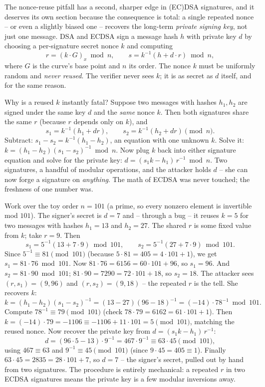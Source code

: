 The nonce-reuse pitfall has a second, sharper edge in (EC)DSA signatures, and it deserves its own section because the consequence is total: a single repeated nonce -- or even a slightly biased one -- recovers the long-term \emph{private signing key}, not just one message. DSA and ECDSA sign a message hash $h$ with private key $d$ by choosing a per-signature secret nonce $k$ and computing
\[
r = (k\cdot G)_x \bmod n, \qquad s = k^{-1}(h + d\cdot r) \bmod n,
\]
where $G$ is the curve's base point and $n$ its order. The nonce $k$ must be uniformly random and \emph{never reused}. The verifier never sees $k$; it is as secret as $d$ itself, and for the same reason.

\begin{whybox}
Why is a reused $k$ instantly fatal? Suppose two messages with hashes $h_1, h_2$ are signed under the same key $d$ and the \emph{same} nonce $k$. Then both signatures share the same $r$ (because $r$ depends only on $k$), and
\[
s_1 = k^{-1}(h_1 + d r), \qquad s_2 = k^{-1}(h_2 + d r) \pmod n.
\]
Subtract: $s_1 - s_2 = k^{-1}(h_1 - h_2)$, an equation with one unknown $k$. Solve it: $k = (h_1 - h_2)(s_1 - s_2)^{-1} \bmod n$. Now plug $k$ back into either signature equation and solve for the private key: $d = (s_1 k - h_1)\, r^{-1} \bmod n$. Two signatures, a handful of modular operations, and the attacker holds $d$ -- she can now forge a signature on \emph{anything}. The math of ECDSA was never touched; the freshness of one number was.
\end{whybox}

\begin{example}
\label{ch38:ex-ecdsa}
Work over the toy order $n = 101$ (a prime, so every nonzero element is invertible mod $101$). The signer's secret is $d = 7$ and -- through a bug -- it reuses $k = 5$ for two messages with hashes $h_1 = 13$ and $h_2 = 27$. The shared $r$ is some fixed value from $k$; take $r = 9$. Then
\[
s_1 = 5^{-1}(13 + 7\cdot 9) \bmod 101, \qquad s_2 = 5^{-1}(27 + 7\cdot 9)\bmod 101.
\]
Since $5^{-1} \equiv 81 \pmod{101}$ (because $5\cdot 81 = 405 = 4\cdot101+1$), we get $s_1 = 81\cdot 76 \bmod 101$. Now $81\cdot76 = 6156 = 60\cdot101 + 96$, so $s_1 = 96$. And $s_2 = 81\cdot 90 \bmod 101$; $81\cdot90 = 7290 = 72\cdot101 + 18$, so $s_2 = 18$. The attacker sees $(r,s_1)=(9,96)$ and $(r,s_2)=(9,18)$ -- the repeated $r$ is the tell. She recovers $k$:
\[
k = (h_1 - h_2)(s_1 - s_2)^{-1} = (13-27)(96-18)^{-1} = (-14)\cdot 78^{-1} \bmod 101.
\]
Compute $78^{-1}\equiv 79 \pmod{101}$ (check $78\cdot79 = 6162 = 61\cdot101 + 1$). Then $k = (-14)\cdot 79 = -1106 \equiv -1106 + 11\cdot101 = 5 \pmod{101}$, matching the reused nonce. Now recover the private key from $d = (s_1 k - h_1)\, r^{-1}$:
\[
d = (96\cdot 5 - 13)\cdot 9^{-1} = 467\cdot 9^{-1} \equiv 63 \cdot 45 \pmod{101},
\]
using $467 \equiv 63$ and $9^{-1}\equiv 45 \pmod{101}$ (since $9\cdot45 = 405 \equiv 1$). Finally $63\cdot 45 = 2835 = 28\cdot101 + 7$, so $d = 7$ -- the signer's secret, pulled out by hand from two signatures. The procedure is entirely mechanical: a repeated $r$ in two ECDSA signatures means the private key is a few modular inversions away.
\end{example}

